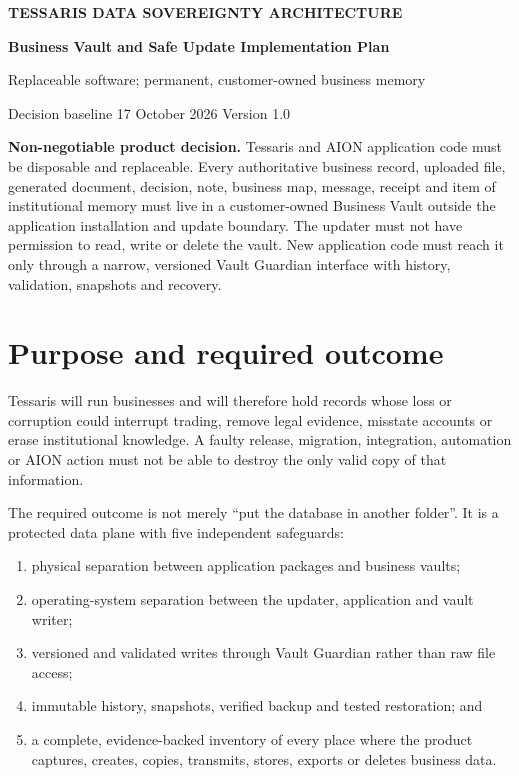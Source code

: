 \documentclass[11pt]{article}
\begin{document}
\begin{center}
  {\small\bfseries\color{TessarisBlue} TESSARIS DATA SOVEREIGNTY ARCHITECTURE}\par
  \vspace{8pt}
  {\LARGE\bfseries Business Vault and Safe Update Implementation Plan}\par
  \vspace{7pt}
  {\large Replaceable software; permanent, customer-owned business memory}\par
  \vspace{12pt}
  {\color{TessarisGrey}Decision baseline \textbullet{} 17 October 2026 \textbullet{} Version 1.0}
\end{center}

\vspace{8pt}
\noindent\colorbox{TessarisPale}{\parbox{0.96\linewidth}{
\textbf{Non-negotiable product decision.} Tessaris and AION application code must be disposable and replaceable. Every authoritative business record, uploaded file, generated document, decision, note, business map, message, receipt and item of institutional memory must live in a customer-owned Business Vault outside the application installation and update boundary. The updater must not have permission to read, write or delete the vault. New application code must reach it only through a narrow, versioned Vault Guardian interface with history, validation, snapshots and recovery.
}}

\tableofcontents
\newpage

\section{Purpose and required outcome}

Tessaris will run businesses and will therefore hold records whose loss or corruption could interrupt trading, remove legal evidence, misstate accounts or erase institutional knowledge. A faulty release, migration, integration, automation or AION action must not be able to destroy the only valid copy of that information.

The required outcome is not merely ``put the database in another folder''. It is a protected data plane with five independent safeguards:

\begin{enumerate}
  \item physical separation between application packages and business vaults;
  \item operating-system separation between the updater, application and vault writer;
  \item versioned and validated writes through Vault Guardian rather than raw file access;
  \item immutable history, snapshots, verified backup and tested restoration; and
  \item a complete, evidence-backed inventory of every place where the product captures, creates, copies, transmits, stores, exports or deletes business data.
\end{enumerate}
\end{document}
